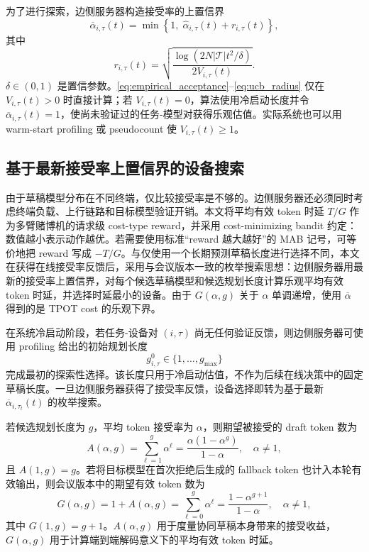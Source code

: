\documentclass[11pt,a4paper]{ctexart}
\begin{document}
为了进行探索，边侧服务器构造接受率的上置信界
\begin{equation}
    \overline{\alpha}_{i,\tau}(t)
    =
    \min
    \left\{
    1,\;
    \widehat{\alpha}_{i,\tau}(t)
    +
    r_{i,\tau}(t)
    \right\},
    \label{eq:ucb_acceptance}
\end{equation}
其中
\begin{equation}
    r_{i,\tau}(t)
    =
    \sqrt{
    \frac{
    \log\!\left(2N|\mathcal{T}|t^2/\delta\right)
    }
    {2V_{i,\tau}(t)}
    }.
    \label{eq:ucb_radius}
\end{equation}
$\delta\in(0,1)$ 是置信参数。\cref{eq:empirical_acceptance}--\cref{eq:ucb_radius} 仅在 $V_{i,\tau}(t)>0$ 时直接计算；若 $V_{i,\tau}(t)=0$，算法使用冷启动长度并令 $\overline{\alpha}_{i,\tau}(t)=1$，使尚未验证过的任务-模型对获得乐观估值。实际系统也可以用 warm-start profiling 或 pseudocount 使 $V_{i,\tau}(t)\geq 1$。

\subsection{基于最新接受率上置信界的设备搜索}
\label{subsec:effective_rate}

由于草稿模型分布在不同终端，仅比较接受率是不够的。边侧服务器还必须同时考虑终端负载、上行链路和目标模型验证开销。本文将平均有效 token 时延 $T/G$ 作为多臂赌博机的请求级 cost-type reward，并采用 cost-minimizing bandit 约定：数值越小表示动作越优。若需要使用标准“reward 越大越好”的 MAB 记号，可等价地把 reward 写成 $-T/G$。与仅使用一个长期预测草稿长度进行选择不同，本文在获得在线接受率反馈后，采用与会议版本一致的枚举搜索思想：边侧服务器用最新的接受率上置信界，对每个候选草稿模型和候选规划长度计算乐观平均有效 token 时延，并选择时延最小的设备。由于 $G(\alpha,g)$ 关于 $\alpha$ 单调递增，使用 $\overline{\alpha}$ 得到的是 TPOT cost 的乐观下界。

在系统冷启动阶段，若任务-设备对 $(i,\tau)$ 尚无任何验证反馈，则边侧服务器可使用 profiling 给出的初始规划长度
\begin{equation}
    g_{i,\tau}^{0}\in\{1,\ldots,g_{\max}\}
\end{equation}
完成最初的探索性选择。该长度只用于冷启动估值，不作为后续在线决策中的固定草稿长度。一旦边侧服务器获得了接受率反馈，设备选择即转为基于最新 $\overline{\alpha}_{i,\tau_t}(t)$ 的枚举搜索。

若候选规划长度为 $g$，平均 token 接受率为 $\alpha$，则期望被接受的 draft token 数为
\begin{equation}
    A(\alpha,g)
    =
    \sum_{\ell=1}^{g}\alpha^\ell
    =
    \frac{\alpha(1-\alpha^g)}{1-\alpha},
    \quad \alpha\neq 1,
    \label{eq:expected_accepted_draft_tokens}
\end{equation}
且 $A(1,g)=g$。若将目标模型在首次拒绝后生成的 fallback token 也计入本轮有效输出，则会议版本中的期望有效 token 数为
\begin{equation}
    G(\alpha,g)
    =
    1+A(\alpha,g)
    =
    \sum_{\ell=0}^{g}\alpha^\ell
    =
    \frac{1-\alpha^{g+1}}{1-\alpha},
    \quad \alpha\neq 1,
    \label{eq:expected_valid_tokens}
\end{equation}
其中 $G(1,g)=g+1$。$A(\alpha,g)$ 用于度量协同草稿本身带来的接受收益，$G(\alpha,g)$ 用于计算端到端解码意义下的平均有效 token 时延。
\end{document}
